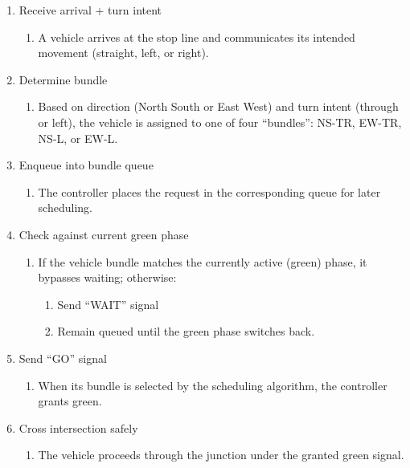 \begin{enumerate}
    \item Receive arrival + turn intent
        \begin{enumerate}[label=(\alph*)]
            \item A vehicle arrives at the stop line and communicates its intended movement (straight, left, or right).
        \end{enumerate}
    \item Determine bundle
        \begin{enumerate}[label=(\alph*)]
            \item Based on direction (North South or East West) and turn intent (through or left), the vehicle is assigned to one of four “bundles”: NS-TR, EW-TR, NS-L, or EW-L.
        \end{enumerate}  
    \item Enqueue into bundle queue
            \begin{enumerate}[label=(\alph*)]
            \item The controller places the request in the corresponding queue for later scheduling.
            \end{enumerate}  
    \item Check against current green phase
            \begin{enumerate}[label=(\alph*)]
                \item If the vehicle bundle matches the currently active (green) phase, it bypasses waiting; otherwise:
                \begin{enumerate}[label=(\alph*)]
                \item Send “WAIT” signal
                \item Remain queued until the green phase switches back.
                \end{enumerate}  
            \end{enumerate}  
    \item Send “GO” signal
            \begin{enumerate}[label=(\alph*)]
                \item When its bundle is selected by the scheduling algorithm, the controller grants green.
            \end{enumerate}  
    \item Cross intersection safely
            \begin{enumerate}[label=(\alph*)]
                \item The vehicle proceeds through the junction under the granted green signal.
            \end{enumerate}
\end{enumerate}

